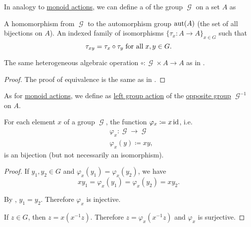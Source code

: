 \begin{definition}\label{def:left_group_action}
  In analogy to \hyperref[def:left_monoid_action]{monoid actions}, we can define a  of the group \( \mscrG \) on a set \( A \) as
  \begin{thmenum}
     A homomorphism from \( \mscrG \) to the automorphism group \( \operatorname{aut}(A) \) (the set of all bijections on \( A \)).
     An indexed family of isomorphisms \( \{ \tau_x: A \to A \}_{x \in G} \) such that
    \begin{equation}\label{eq:def:left_group_action/indirect_homomorphism}
      \tau_{xy} = \tau_x \circ \tau_y \T{for all} x, y \in G.
    \end{equation}

     The same heterogeneous algebraic operation \( \circ: \mscrG \times A \to A \) as in .
  \end{thmenum}
\end{definition}
\begin{proof}
  The proof of equivalence is the same as in .
\end{proof}

\begin{definition}\label{def:right_group_action}
  As for \hyperref[def:right_monoid_action]{monoid actions}, we define  as \hyperref[def:left_group_action]{left group action} of the \hyperref[def:magma/opposite]{opposite group} \( \mscrG^{-1} \) on \( A \).
\end{definition}

\begin{lemma}\label{thm:group_multiplication_is_bijection}
  For each element \( x \) of a group \( \mscrG \), the function \( \varphi_x \coloneqq x\operatorname{id} \), i.e.
  \begin{align*}
    &\varphi_x: \mscrG \to \mscrG \\
    &\varphi_x(y) \coloneqq xy,
  \end{align*}
  is an bijection (but not necessarily an isomorphism).
\end{lemma}
\begin{proof}
   If \( y_1, y_2 \in G \) and \( \varphi_x(y_1) = \varphi_x(y_2) \), we have
  \begin{equation*}
    xy_1 = \varphi_x(y_1) = \varphi_x(y_2) = xy_2.
  \end{equation*}

  By , \( y_1 = y_2 \). Therefore \( \varphi_x \) is injective.

   If \( z \in G \), then \( z = x(x^{-1} z) \). Therefore \( z = \varphi_x(x^{-1} z) \) and \( \varphi_x \) is surjective.
\end{proof}

